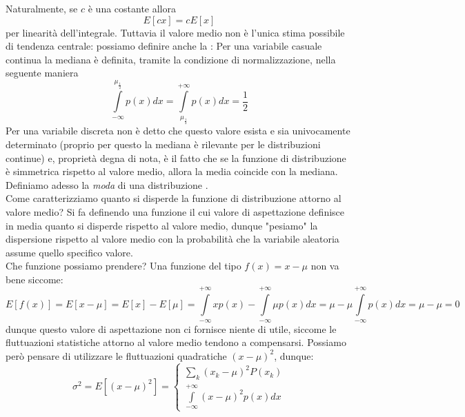 \documentclass{report}
\begin{document}
\noindent Naturalmente, se $c$ è una costante allora
$$
	E[cx] = cE[x]
$$
per linearità dell'integrale.
\noindent Tuttavia il valore medio non è l'unica stima possibile di tendenza centrale: possiamo definire anche la \emph{}:
\noindent Per una variabile casuale continua la mediana è definita, tramite la condizione di normalizzazione, nella seguente maniera
$$
	\int\limits_{-\infty}^{\mu_{\frac{1}{2}}} p(x)dx = \int\limits_{\mu_{\frac{1}{2}}}^{+\infty} p(x)dx = \frac{1}{2}
$$
Per una variabile discreta non è detto che questo valore esista e sia univocamente determinato (proprio per questo la mediana è rilevante per le distribuzioni continue) e, proprietà degna di nota, è il fatto che se la funzione di distribuzione è simmetrica rispetto al valore medio, allora la media coincide con la mediana. Definiamo adesso la \emph{moda} di una distribuzione
. \\
Come caratterizziamo quanto si disperde la funzione di distribuzione attorno al valore medio? Si fa definendo una funzione  il cui valore di aspettazione definisce in media quanto si disperde rispetto al valore medio, dunque "pesiamo" la dispersione rispetto al valore medio con la probabilità che la variabile aleatoria assume quello specifico valore. \\
Che funzione possiamo prendere? Una funzione del tipo $f(x) = x - \mu$ non va bene siccome:
$$
	E[f(x)] = E[x-\mu] = E[x]-E[\mu] = \int\limits_{-\infty}^{+\infty} xp(x) - \int\limits_{-\infty}^{+\infty} \mu p(x)dx = \mu - \mu \int\limits_{-\infty}^{+\infty} p(x)dx = \mu - \mu = 0
$$
dunque questo valore di aspettazione non ci fornisce niente di utile, siccome le fluttuazioni statistiche attorno al valore medio tendono a compensarsi. Possiamo però pensare di utilizzare le fluttuazioni quadratiche $(x-\mu)^2$, dunque:
\begin{equation}
\sigma^2 = E[(x-\mu)^2] = \begin{cases} \sum\limits_{k} (x_k - \mu)^2 P(x_k) \\
\int\limits_{-\infty}^{+\infty} (x-\mu)^2 p(x)dx
 \end{cases}
\end{equation}
\end{document}
